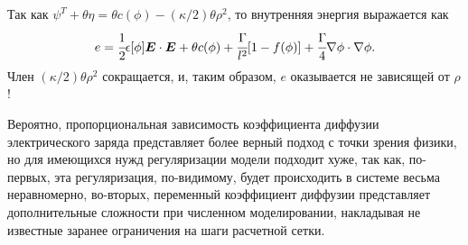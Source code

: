 Так как $\psi^T + \theta \eta = \theta c(\phi) - (\kappa / 2) \theta \rho^2$, то внутренняя энергия выражается как
\[
    e = \cfrac{1}{2} \epsilon[\phi] {\boldsymbol{E}} \cdot {\boldsymbol{E}} + \theta c(\phi) + \cfrac{\Gamma}{l^2}[1 - f(\phi)] + \cfrac{\Gamma}{4} \nabla \phi \cdot \nabla \phi.
\]
Член $(\kappa / 2) \theta \rho^2$ сокращается, и, таким образом, $e$ оказывается не зависящей от $\rho$ !

Вероятно, пропорциональная зависимость коэффициента диффузии электрического заряда представляет более верный подход с точки зрения физики, но для имеющихся нужд регуляризации модели подходит хуже, так как, по-первых, эта регуляризация, по-видимому, будет происходить в системе весьма неравномерно, во-вторых, переменный коэффициент диффузии представляет дополнительные сложности при численном моделировании, накладывая не известные заранее ограничения на шаги расчетной сетки.